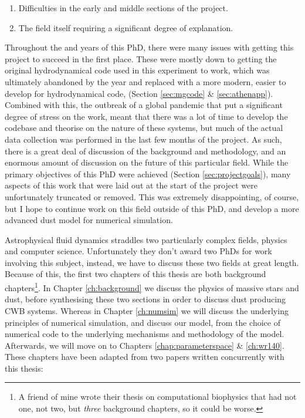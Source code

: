 \begin{enumerate}
  \item Difficulties in the early and middle sections of the project.
  \item The field itself requiring a significant degree of explanation.
\end{enumerate}

\noindent
Throughout the  and  years of this PhD, there were many issues with getting this project to succeed in the first place.
These were mostly down to getting the original hydrodynamical code used in this experiment to work, which was ultimately abandoned by the  year and replaced with a more modern, easier to develop for hydrodynamical code, \athena{} (Section \ref{sec:mgcode} \& \ref{sec:athenapp}).
Combined with this, the outbreak of a global pandemic that put a significant degree of stress on the work, meant that there was a lot of time to develop the codebase and theorise on the nature of these systems, but much of the actual data collection was performed in the last few months of the project.
As such, there is a great deal of discussion of the background and methodology, and an enormous amount of discussion on the future of this particular field.
While the primary objectives of this PhD were achieved (Section \ref{sec:projectgoals}), many aspects of this work that were laid out at the start of the project were unfortunately truncated or removed.
This was extremely disappointing, of course, but I hope to continue work on this field outside of this PhD, and develop a more advanced dust model for numerical simulation.

Astrophysical fluid dynamics straddles two particularly complex fields, physics and computer science.
Unfortunately they don't award two PhDs for work involving this subject, instead, we have to discuss these two fields at great length.
Because of this, the first two chapters of this thesis are both background chapters\footnote{A friend of mine wrote their thesis on computational biophysics that had not one, not two, but \emph{three} background chapters, so it could be worse.}.
In Chapter \ref{ch:background} we discuss the physics of massive stars and dust, before synthesising these two sections in order to discuss dust producing CWB systems.
Whereas in Chapter \ref{ch:numsim} we will discuss the underlying principles of numerical simulation, and discuss our model, from the choice of numerical code to the underlying mechanisms and methodology of the model.
Afterwards, we will move on to Chapters \ref{chap:parameterspace} \& \ref{ch:wr140}.
These chapters have been adapted from two papers written concurrently with this thesis:

